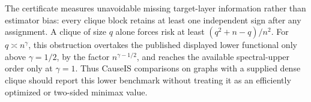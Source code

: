 The certificate measures unavoidable missing target-layer information rather than estimator bias: every clique block retains at least one independent sign after any assignment.  A clique of size \(q\) alone forces risk at least \((q^2+n-q)/n^2\).  For \(q\asymp n^{\gamma}\), this obstruction overtakes the published displayed lower functional only above \(\gamma=1/2\), by the factor \(n^{\gamma-1/2}\), and reaches the available spectral-upper order only at \(\gamma=1\).  Thus CauseIS comparisons on graphs with a supplied dense clique should report this lower benchmark without treating it as an efficiently optimized or two-sided minimax value.